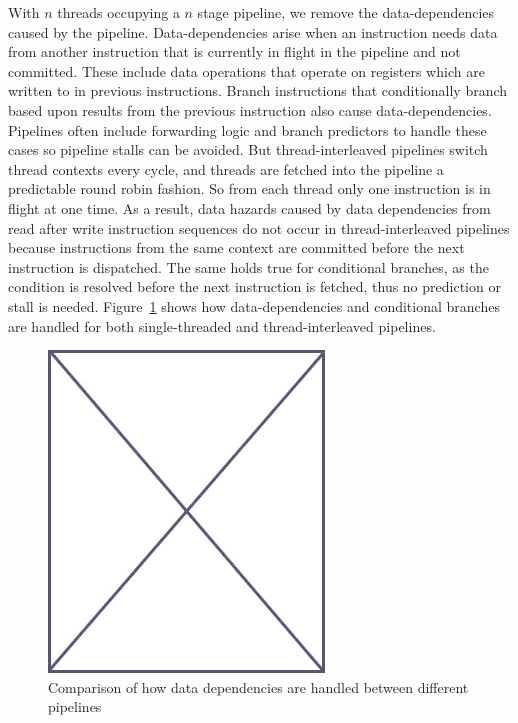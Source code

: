 With $n$ threads occupying a $n$ stage pipeline, we remove the data-dependencies caused by the pipeline.
Data-dependencies arise when an instruction needs data from another instruction that is currently in flight in the pipeline and not committed. 
These include data operations that operate on registers which are written to in previous instructions. 
Branch instructions that conditionally branch based upon results from the previous instruction also cause data-dependencies.   
Pipelines often include forwarding logic and branch predictors to handle these cases so pipeline stalls can be avoided.
But thread-interleaved pipelines switch thread contexts every cycle, and threads are fetched into the pipeline a predictable round robin fashion.
So from each thread only one instruction is in flight at one time. 
As a result, data hazards caused by data dependencies from read after write instruction sequences do not occur in thread-interleaved pipelines because instructions from the same context are committed before the next instruction is dispatched.
The same holds true for conditional branches, as the condition is resolved before the next instruction is fetched, thus no prediction or stall is needed.      
Figure~\ref{fig:hazard_comparison_between_pipelines} shows how data-dependencies and conditional branches are handled for both single-threaded and thread-interleaved pipelines.      
\begin{figure}
\begin{center}
\includegraphics[scale=.4]{figs/placeholder}
\end{center}
\caption{Comparison of how data dependencies are handled between different pipelines}
\label{fig:hazard_comparison_between_pipelines}
\end{figure}

